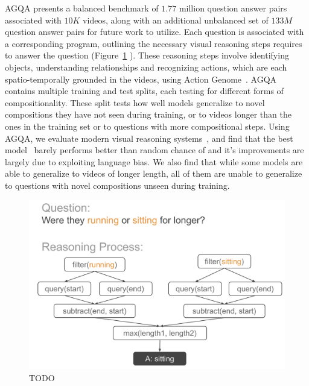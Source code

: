 AGQA presents a balanced benchmark of $1.77$ million question answer pairs associated with $10K$ videos, along with an additional unbalanced set of $133M$ question answer pairs for future work to utilize. Each question is associated with a corresponding program, outlining the necessary visual reasoning steps requires to answer the question (Figure~\ref{fig:tree} ). These reasoning steps involve identifying objects, understanding relationships and recognizing actions, which are each spatio-temporally grounded in the videos, using Action Genome~\cite{ji2020action}. AGQA contains multiple training and test splits, each testing for different forms of compositionality. These split tests how well models generalize to novel compositions they have not seen during training, or to videos longer than the ones in the training set or to questions with more compositional steps. Using AGQA, we evaluate modern visual reasoning systems~\cite{}, and find that the best model~\cite{} barely performs better than random chance of and it's improvements are largely due to exploiting language bias. We also find that while some models are able to generalize to videos of longer length, all of them are unable to generalize to questions with novel compositions unseen during training.

\begin{figure}[t]
    \centering
    \includegraphics[width=0.95\linewidth]{figures/reasoning tree.pdf}
    \caption{TODO}
    \label{fig:tree}
\end{figure}


